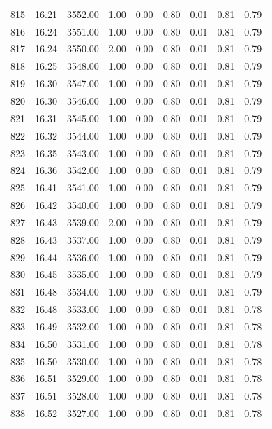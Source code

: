\documentclass{article}\usepackage[]{graphicx}\usepackage[]{color}
\begin{document}
\begin{longtable}{rrrrrrrrr}
  815 & 16.21 & 3552.00 & 1.00 & 0.00 & 0.80 & 0.01 & 0.81 & 0.79 \\ 
  816 & 16.24 & 3551.00 & 1.00 & 0.00 & 0.80 & 0.01 & 0.81 & 0.79 \\ 
  817 & 16.24 & 3550.00 & 2.00 & 0.00 & 0.80 & 0.01 & 0.81 & 0.79 \\ 
  818 & 16.25 & 3548.00 & 1.00 & 0.00 & 0.80 & 0.01 & 0.81 & 0.79 \\ 
  819 & 16.30 & 3547.00 & 1.00 & 0.00 & 0.80 & 0.01 & 0.81 & 0.79 \\ 
  820 & 16.30 & 3546.00 & 1.00 & 0.00 & 0.80 & 0.01 & 0.81 & 0.79 \\ 
  821 & 16.31 & 3545.00 & 1.00 & 0.00 & 0.80 & 0.01 & 0.81 & 0.79 \\ 
  822 & 16.32 & 3544.00 & 1.00 & 0.00 & 0.80 & 0.01 & 0.81 & 0.79 \\ 
  823 & 16.35 & 3543.00 & 1.00 & 0.00 & 0.80 & 0.01 & 0.81 & 0.79 \\ 
  824 & 16.36 & 3542.00 & 1.00 & 0.00 & 0.80 & 0.01 & 0.81 & 0.79 \\ 
  825 & 16.41 & 3541.00 & 1.00 & 0.00 & 0.80 & 0.01 & 0.81 & 0.79 \\ 
  826 & 16.42 & 3540.00 & 1.00 & 0.00 & 0.80 & 0.01 & 0.81 & 0.79 \\ 
  827 & 16.43 & 3539.00 & 2.00 & 0.00 & 0.80 & 0.01 & 0.81 & 0.79 \\ 
  828 & 16.43 & 3537.00 & 1.00 & 0.00 & 0.80 & 0.01 & 0.81 & 0.79 \\ 
  829 & 16.44 & 3536.00 & 1.00 & 0.00 & 0.80 & 0.01 & 0.81 & 0.79 \\ 
  830 & 16.45 & 3535.00 & 1.00 & 0.00 & 0.80 & 0.01 & 0.81 & 0.79 \\ 
  831 & 16.48 & 3534.00 & 1.00 & 0.00 & 0.80 & 0.01 & 0.81 & 0.79 \\ 
  832 & 16.48 & 3533.00 & 1.00 & 0.00 & 0.80 & 0.01 & 0.81 & 0.78 \\ 
  833 & 16.49 & 3532.00 & 1.00 & 0.00 & 0.80 & 0.01 & 0.81 & 0.78 \\ 
  834 & 16.50 & 3531.00 & 1.00 & 0.00 & 0.80 & 0.01 & 0.81 & 0.78 \\ 
  835 & 16.50 & 3530.00 & 1.00 & 0.00 & 0.80 & 0.01 & 0.81 & 0.78 \\ 
  836 & 16.51 & 3529.00 & 1.00 & 0.00 & 0.80 & 0.01 & 0.81 & 0.78 \\ 
  837 & 16.51 & 3528.00 & 1.00 & 0.00 & 0.80 & 0.01 & 0.81 & 0.78 \\ 
  838 & 16.52 & 3527.00 & 1.00 & 0.00 & 0.80 & 0.01 & 0.81 & 0.78 \\ 

\end{longtable}
\end{document}
